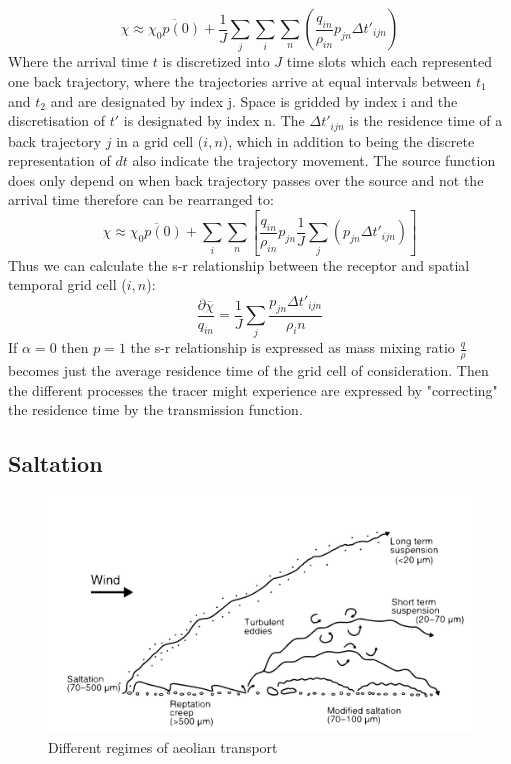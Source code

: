 \begin{equation}\label{eq:discrete_mix_ratio}
    \chi \approx \overline{\chi_0p(0)} + \frac{1}{J} \sum_j \sum_i \sum_n \left(\frac{q_{in}}{\rho_{in}}p_{jn}\Delta t'_{ijn}\right)
\end{equation}
Where the arrival time $t$ is discretized into $J$ time slots which each represented one back trajectory, where the trajectories arrive at equal intervals between $t_1$ and $t_2$ and are designated by index j. Space is gridded by index i and the discretisation of $t'$ is designated by index n. The $\Delta t'_{ijn}$ is the residence time of a back trajectory $j$ in a grid cell ($i,n$), which in addition to being the discrete representation of $dt$ also indicate the trajectory movement. The source function does only depend on when back trajectory passes over the source and not the arrival time therefore  can be rearranged to:
\begin{equation}
    \chi \approx \overline{\chi_0p(0)} + \sum_i \sum_n \left[\frac{q_{in}}{\rho_{in}}p_{jn} \frac{1}{J}\sum_j (p_{jn}\Delta t'_{ijn})\right]
\end{equation}
Thus we can calculate the s-r relationship between the receptor and spatial temporal grid cell ($i,n$):
\begin{equation}
    \frac{\partial \overline{\chi}}{q_{in}} = \frac{1}{J} \sum_j \frac{p_{jn} \Delta t'_{ijn}}{\rho_in}
\end{equation}
If $\alpha=0$ then $p=1$ the s-r relationship is expressed as mass mixing ratio $\frac{q}{\rho}$ becomes just the average residence time of the grid cell of consideration. Then the different processes the tracer might experience are expressed by "correcting" the residence time by the transmission function. 


\subsection{Saltation}\label{fig:Regimes_of_aeolian_transport}
\begin{figure}[htbp]
  \centering
  \includegraphics[width = \textwidth]{texfiles/figs/aeolian_transport_Parsons_Abrahams.pdf}
  \caption{Different regimes of aeolian transport \parencite{nickling2009aeolian}}
\end{figure}
